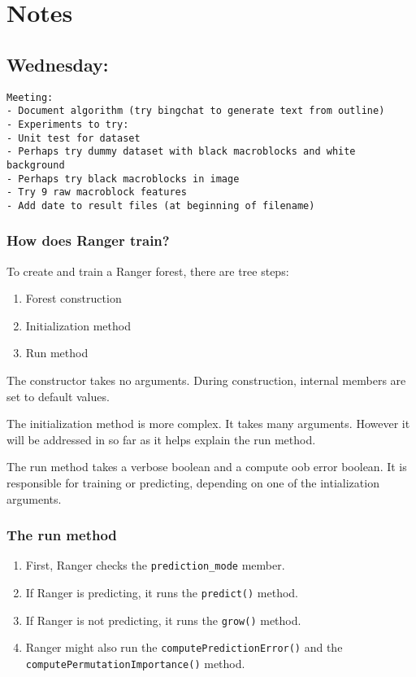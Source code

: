 \documentclass[12pt,oneside]{book}
\begin{document}
  \newpage

  \section*{Notes}
  \setlength\parindent{0pt}

\subsection*{Wednesday:}
\begin{lstlisting}
Meeting:
- Document algorithm (try bingchat to generate text from outline)
- Experiments to try:
- Unit test for dataset
- Perhaps try dummy dataset with black macroblocks and white background
- Perhaps try black macroblocks in image
- Try 9 raw macroblock features
- Add date to result files (at beginning of filename)
\end{lstlisting}

\subsubsection{How does Ranger train?}
To create and train a Ranger forest, there are tree steps:
\begin{enumerate}
  \item Forest construction
  \item Initialization method
  \item Run method
\end{enumerate}

The constructor takes no arguments. During construction, internal members are set to default values.

The initialization method is more complex. It takes many arguments. However it will be addressed in so far as it helps explain the run method.

The run method takes a verbose boolean and a compute oob error boolean. It is responsible for training or predicting, depending on one of the intialization arguments.

\subsubsection{The run method}

\begin{enumerate}
  \item First, Ranger checks the \lstinline|prediction_mode| member.
  \item If Ranger is predicting, it runs the \lstinline|predict()| method.
  \item If Ranger is not predicting, it runs the \lstinline|grow()| method.
  \item Ranger might also run the \lstinline|computePredictionError()| and the \lstinline|computePermutationImportance()| method.
\end{enumerate}
\end{document}
